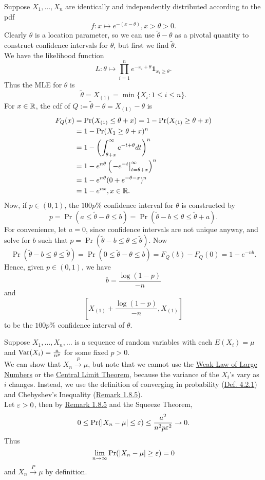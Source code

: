 \documentclass[11pt,fleqn]{book} %
\begin{document}
\begin{example} \label{eg:822}
Suppose \(X_1, \ldots, X_n\) are identically and independently distributed according to the pdf
\[
f: x\mapsto e^{-(x - \theta)}, x > \theta > 0.
\]
\indent Clearly \(\theta\) is a location parameter, so we can use \(\tilde{\theta} - \theta\) as a pivotal quantity to construct confidence intervals for \(\theta\), but first we find \(\tilde{\theta}\). \\
\indent We have the likelihood function
\[
L: \theta \mapsto \prod_{i=1}^n e^{-x_i + \theta} \mathbf{1}_{x_i \geq \theta}.
\]
\indent Thus the MLE for \(\theta\) is
\[
\tilde{\theta} = X_{(1)} = \min\{X_i:1 \leq i \leq n\}.
\]
\indent For \(x \in \mathbb{R}\), the cdf of \(Q := \tilde{\theta} - \theta = X_{(1)} - \theta\) is
\[
\begin{aligned}
F_Q(x) &= \Pr(X_{(1)} \leq \theta + x) = 1 - \Pr(X_{(1)} \geq \theta + x) \\
&= 1 - \Pr(X_1 \geq \theta + x)^n \\
&= 1 - \left(\int_{\theta + x}^\infty e^{-t + \theta}dt\right)^n \\
&= 1 - e^{n\theta}\left(\left.-e^{-t}\right|_{t = \theta + x}^\infty\right)^n \\
&= 1 - e^{n\theta}(0 + e^{-\theta - x})^n \\
&= 1 - e^{nx}, x \in \mathbb{R}.
\end{aligned}
\]
\indent Now, if \(p \in (0, 1)\), the \(100p\%\) confidence interval for \(\theta\) is constructed by
\[
p = \Pr(a \leq \tilde{\theta} - \theta \leq b) = \Pr(\tilde{\theta} - b \leq \theta \leq \tilde{\theta} + a).
\]
\indent For convenience, let \(a = 0\), since confidence intervals are not unique anyway, and solve for \(b\) such that \(p = \Pr(\tilde{\theta} - b \leq \theta \leq \tilde{\theta})\). Now
\[
\Pr(\tilde{\theta} - b \leq \theta \leq \tilde{\theta}) = \Pr(0 \leq \tilde{\theta} - \theta \leq b) = F_Q(b) - F_Q(0) = 1 - e^{-nb}.
\]
\indent Hence, given \(p \in (0, 1)\), we have
\[
b = \frac{\log(1 - p)}{-n}
\]
and
\[
\left[X_{(1)} + \frac{\log(1 - p)}{-n}, X_{(1)}\right]
\]
to be the \(100p\%\) confidence interval of \(\theta\).
\end{example}

\begin{example} \label{eg:823}
Suppose \(X_1, \ldots, X_n, \ldots\) is a sequence of random variables with each \(E(X_i) = \mu\) and \(\operatorname{Var}(X_i) = \frac{a}{n^p}\) for some fixed \(p > 0\). \\
\indent We can show that \(X_n \xrightarrow{P} \mu\), but note that we cannot use the \hyperref[thm:431]{Weak Law of Large Numbers} or the \hyperref[thm:443]{Central Limit Theorem}, because the variance of the \(X_i\)'s vary as \(i\) changes. Instead, we use the definition of converging in probability (\hyperref[def:421]{Def. 4.2.1}) and Chebyshev's Inequality (\hyperref[cor:184]{Remark 1.8.5}). \\
\indent Let \(\varepsilon > 0\), then by \hyperref[cor:184]{Remark 1.8.5} and the Squeeze Theorem,
\[
0 \leq \Pr(|X_n - \mu| \leq \varepsilon) \leq \frac{a^2}{n^2p\varepsilon^2} \rightarrow 0.
\]
\indent Thus
\[
\lim_{n\rightarrow\infty}\Pr(|X_n - \mu| \geq \varepsilon) = 0
\]
and \(X_n \xrightarrow{P} \mu\) by definition.
\end{example}
\end{document}
